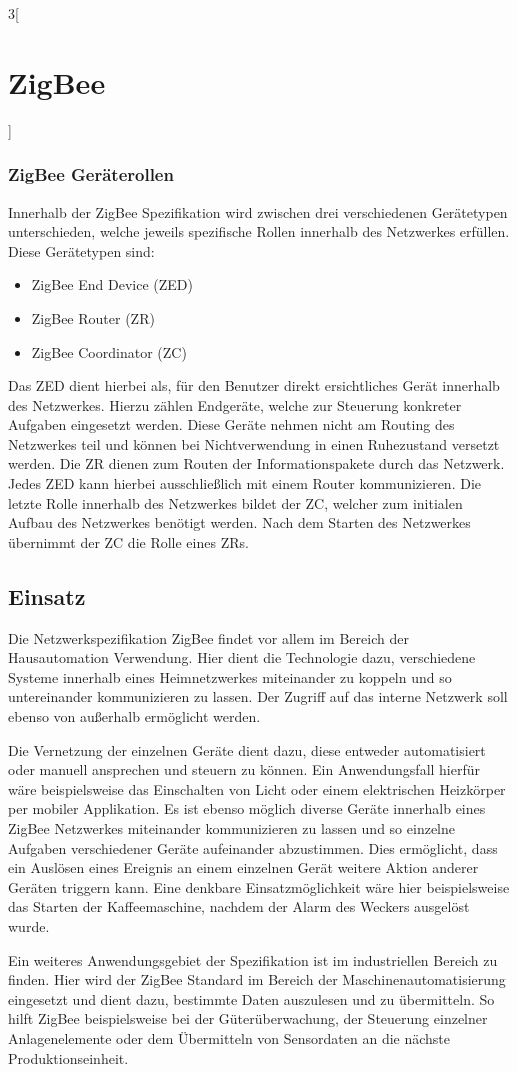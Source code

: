 \begin{multicols}{3}[\section{ZigBee}]
\subsubsection*{ZigBee Geräterollen}
Innerhalb der ZigBee Spezifikation wird zwischen drei verschiedenen Gerätetypen unterschieden, welche jeweils spezifische Rollen innerhalb des Netzwerkes erfüllen. Diese Gerätetypen sind: 
\begin{itemize}
	\item ZigBee End Device (ZED)
	\item ZigBee Router (ZR)
	\item ZigBee Coordinator (ZC)
\end{itemize}
Das ZED dient hierbei als, für den Benutzer direkt ersichtliches Gerät innerhalb des Netzwerkes. Hierzu zählen Endgeräte, welche zur Steuerung konkreter Aufgaben eingesetzt werden. Diese Geräte nehmen nicht am Routing des Netzwerkes teil und können bei Nichtverwendung in einen Ruhezustand versetzt werden. Die ZR dienen zum Routen der Informationspakete durch das Netzwerk. Jedes ZED kann hierbei ausschließlich mit einem Router kommunizieren. Die letzte Rolle innerhalb des Netzwerkes bildet der ZC, welcher zum initialen Aufbau des Netzwerkes benötigt werden. Nach dem Starten des Netzwerkes übernimmt der ZC die Rolle eines ZRs.~\cite{zigbee.10}

\subsection*{Einsatz}
Die Netzwerkspezifikation ZigBee findet vor allem im Bereich der Hausautomation Verwendung. Hier dient die Technologie dazu, verschiedene Systeme innerhalb eines Heimnetzwerkes miteinander zu koppeln und so untereinander kommunizieren zu lassen. Der Zugriff auf das interne Netzwerk soll ebenso von außerhalb ermöglicht werden. 
\par Die Vernetzung der einzelnen Geräte dient dazu, diese entweder automatisiert oder manuell ansprechen und steuern zu können. Ein Anwendungsfall hierfür wäre beispielsweise das Einschalten von Licht oder einem elektrischen Heizkörper per mobiler Applikation. Es ist ebenso möglich diverse Geräte innerhalb eines ZigBee Netzwerkes miteinander kommunizieren zu lassen und so einzelne Aufgaben verschiedener Geräte aufeinander abzustimmen. Dies ermöglicht, dass ein Auslösen eines Ereignis an einem einzelnen Gerät weitere Aktion anderer Geräten triggern kann. Eine denkbare Einsatzmöglichkeit wäre hier beispielsweise das Starten der Kaffeemaschine, nachdem der Alarm des Weckers ausgelöst wurde.  
\par Ein weiteres Anwendungsgebiet der Spezifikation ist im industriellen Bereich zu finden. Hier wird der ZigBee Standard im Bereich der Maschinenautomatisierung eingesetzt und dient dazu, bestimmte Daten auszulesen und zu übermitteln. So hilft ZigBee beispielsweise bei der Güterüberwachung, der Steuerung einzelner Anlagenelemente oder dem Übermitteln von Sensordaten an die nächste Produktionseinheit.~\cite{zigbee.10}


\end{multicols}
